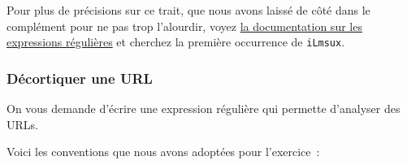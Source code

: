     Pour plus de précisions sur ce trait, que nous avons laissé de côté dans
le complément pour ne pas trop l'alourdir, voyez
\href{https://docs.python.org/3/library/re.html\#regular-expression-syntax}{la
documentation sur les expressions régulières} et cherchez la première
occurrence de \texttt{iLmsux}.

    \hypertarget{duxe9cortiquer-une-url}{%
\subsubsection{Décortiquer une URL}\label{duxe9cortiquer-une-url}}

    On vous demande d'écrire une expression régulière qui permette
d'analyser des URLs.

Voici les conventions que nous avons adoptées pour l'exercice~:

